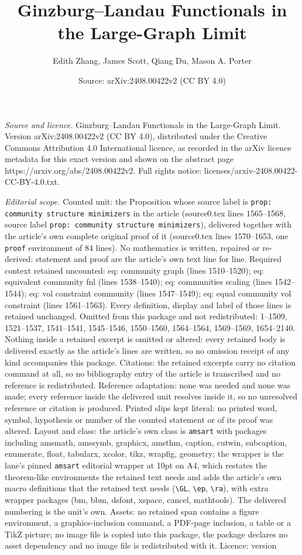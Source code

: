 \documentclass[10pt,a4paper]{amsart}
\title[Ginzburg--Landau Functionals in the Large-Graph Limit]{Ginzburg--Landau Functionals in the Large-Graph Limit}
\author{Edith Zhang, James Scott, Qiang Du, Mason A. Porter}
\date{Source: arXiv:2408.00422v2 (CC BY 4.0)}
\begin{document}
\maketitle

\noindent\emph{Source and licence.} Ginzburg--Landau Functionals in the Large-Graph Limit. Version arXiv:2408.00422v2 (CC BY 4.0), distributed under the Creative Commons Attribution 4.0 International licence, as recorded in the arXiv licence metadata for this exact version and shown on the abstract page https://arxiv.org/abs/2408.00422v2. Full rights notice: licenses/arxiv-2408.00422-CC-BY-4.0.txt.\par\smallskip

\noindent\textit{Editorial scope.} Counted unit: the Proposition whose source label is \texttt{prop: community structure minimizers} in the article (source0.tex lines 1565--1568, source label \texttt{prop: community structure minimizers}), delivered together with the article's own complete original proof of it (source0.tex lines 1570--1653, one \texttt{proof} environment of 84 lines). No mathematics is written, repaired or re-derived: statement and proof are the article's own text line for line. Required context retained uncounted: eq: community graph (lines 1510--1520); eq: equivalent community fnl (lines 1538--1540); eq: communities scaling (lines 1542--1544); eq: vol constraint community (lines 1547--1549); eq: equal community vol constraint (lines 1561--1563). Every definition, display and label of those lines is retained unchanged. Omitted from this package and not redistributed: 1--1509, 1521--1537, 1541--1541, 1545--1546, 1550--1560, 1564--1564, 1569--1569, 1654--2140. Nothing inside a retained excerpt is omitted or altered: every retained body is delivered exactly as the article's lines are written, so no omission receipt of any kind accompanies this package. Citations: the retained excerpts carry no citation command at all, so no bibliography entry of the article is transcribed and no reference is redistributed. Reference adaptation: none was needed and none was made; every reference inside the delivered unit resolves inside it, so no unresolved reference or citation is produced. Printed slips kept literal: no printed word, symbol, hypothesis or number of the counted statement or of its proof was altered. Layout and class: the article's own class is \texttt{amsart} with packages including amsmath, amssymb, graphicx, amsthm, caption, cutwin, subcaption, enumerate, float, tabularx, xcolor, tikz, wrapfig, geometry; the wrapper is the lane's pinned \texttt{amsart} editorial wrapper at 10pt on A4, which restates the theorem-like environments the retained text needs and adds the article's own macro definitions that the retained text needs (\texttt{\textbackslash GL}, \texttt{\textbackslash ep}, \texttt{\textbackslash ra}), with extra wrapper packages (bm, bbm, dsfont, xspace, cancel, mathtools). The delivered numbering is the unit's own. Assets: no retained span contains a figure environment, a graphics-inclusion command, a PDF-page inclusion, a table or a TikZ picture; no image file is copied into this package, the package declares no asset dependency and no image file is redistributed with it. Licence: version 
\end{document}
